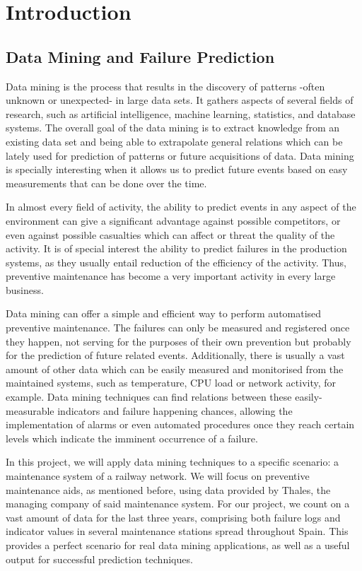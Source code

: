\chapter{Introduction}
\section{Data Mining and Failure Prediction}
\label{sec:about_data_mining}
Data mining is the process that results in the discovery of patterns -often unknown or unexpected- in large data sets. It gathers aspects of several fields of research, such as artificial intelligence, machine learning, statistics, and database systems. The overall goal of the data mining is to extract knowledge from an existing data set and being able to extrapolate general relations which can be lately used for prediction of patterns or future acquisitions of data. Data mining is specially interesting when it allows us to predict future events based on easy measurements that can be done over the time.

In almost every field of activity, the ability to predict events in any aspect of the environment can give a significant advantage against possible competitors, or even against possible casualties which can affect or threat the quality of the activity. It is of special interest the ability to predict failures in the production systems, as they usually entail reduction of the efficiency of the activity. Thus, preventive maintenance has become a very important activity in every large business.

Data mining can offer a simple and efficient way to perform automatised preventive maintenance. The failures can only be measured and registered once they happen, not serving for the purposes of their own prevention but probably for the prediction of future related events. Additionally, there is usually a vast amount of other data which can be easily measured and monitorised from the maintained systems, such as temperature, CPU load or network activity, for example. Data mining techniques can find relations between these easily-measurable indicators and failure happening chances, allowing the implementation of alarms or even automated procedures once they reach certain levels which indicate the imminent occurrence of a failure.

In this project, we will apply data mining techniques to a specific scenario: a maintenance system of a railway network. We will focus on preventive maintenance aids, as mentioned before, using data provided by Thales, the managing company of said maintenance system. For our project, we count on a vast amount of data for the last three years, comprising both failure logs and indicator values in several maintenance stations spread throughout Spain. This provides a perfect scenario for real data mining applications, as well as a useful output for successful prediction techniques.

